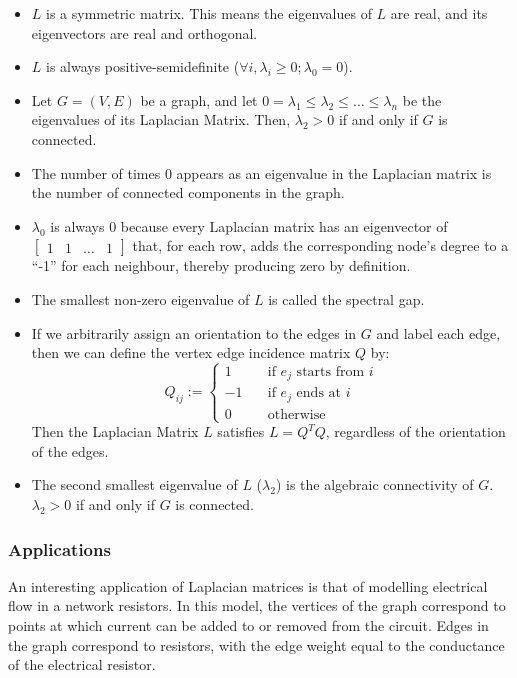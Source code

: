 \begin{itemize}
    \item $L$ is a symmetric matrix. This means the eigenvalues of $L$ are real,
        and its eigenvectors are real and orthogonal.
    \item $L$ is always positive-semidefinite
        ($\forall i,\lambda_i\geq 0;\lambda_0 = 0$).
    \item Let $G=(V,E)$ be a graph, and let
        $0=\lambda_1\leq\lambda_2\leq\ldots\leq\lambda_n$ be the eigenvalues of
        its Laplacian Matrix. Then, $\lambda_2>0$ if and only if $G$ is
        connected.
    \item The number of times 0 appears as an eigenvalue in the Laplacian matrix
        is the number of connected components in the graph.
    \item $\lambda_0$ is always 0 because every Laplacian matrix has an
        eigenvector of $\begin{bmatrix} 1 & 1 & \ldots & 1 \end{bmatrix}$ that,
        for each row, adds the corresponding node's degree to a ``-1'' for each
        neighbour, thereby producing zero by definition.
    \item The smallest non-zero eigenvalue of $L$ is called the spectral gap.
    \item If we arbitrarily assign an orientation to the edges in $G$ and label
        each edge, then we can define the vertex edge incidence matrix $Q$ by:
        \begin{equation}
            Q_{ij} :=
                \left\{
                    \begin{array}{ll}
                        1 &     \quad \text{if $e_j$ starts from $i$}\\
                        -1 &    \quad \text{if $e_j$ ends at $i$}\\
                        0 &     \quad \text{otherwise}
                    \end{array}
                \right.
        \end{equation}
        Then the Laplacian Matrix $L$ satisfies $L = Q^TQ$, regardless of the
        orientation of the edges.
    \item The second smallest eigenvalue of $L$ ($\lambda_2$) is the algebraic
    connectivity of $G$. $\lambda_2>0$ if and only if $G$ is connected.
\end{itemize}

\subsubsection{Applications}
\label{laplacianMatrices:applications}
An interesting application of Laplacian matrices is that of modelling electrical
flow in a network resistors. In this model, the vertices of the graph correspond
to points at which current can be added to or removed from the circuit. Edges in
the graph correspond to resistors, with the edge weight equal to the conductance
of the electrical resistor.

